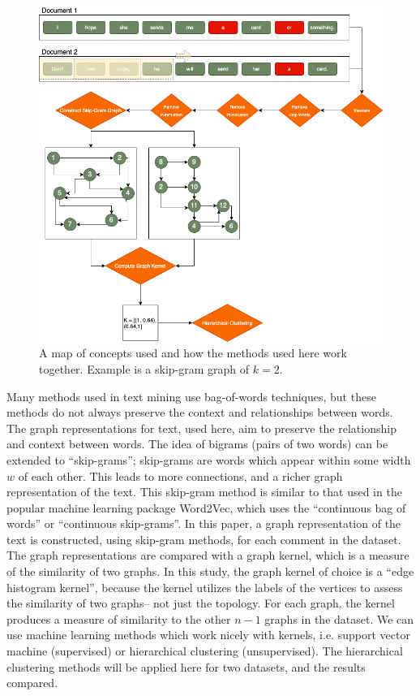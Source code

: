 \begin{figure}
 \includegraphics[width=6in]{Content/Images/Concept_map.png}
 \caption{A map of concepts used and how the methods used here work together. Example is a skip-gram graph of $k=2$.}
 \end{figure}

\hspace*{0.3cm} Many methods used in text mining use bag-of-words techniques, but these methods do not always preserve the context and relationships between words. The graph representations for text, used here, aim to preserve the relationship and context between words. The idea of bigrams (pairs of two words) can be extended to ``skip-grams”; skip-grams are words which appear within some width $w$ of each other. This leads to more connections, and a richer graph representation of the text. This skip-gram method is similar to that used in the popular machine learning package Word2Vec, which uses the “continuous bag of words” or ``continuous skip-grams”. In this paper, a graph representation of the text is constructed, using skip-gram methods, for each comment in the dataset. \\

The graph representations are compared with a graph kernel, which is a measure of the similarity of two graphs. In this study, the graph kernel of choice is a ``edge histogram kernel”, because the kernel utilizes the labels of the vertices to assess the similarity of two graphs– not just the topology. For each graph, the kernel produces a measure of similarity to the other $n-1$ graphs in the dataset. We can use machine learning methods which work nicely with kernels, i.e. support vector machine (supervised) or hierarchical clustering (unsupervised). The hierarchical clustering methods will be applied here for two datasets, and the results compared.\\

